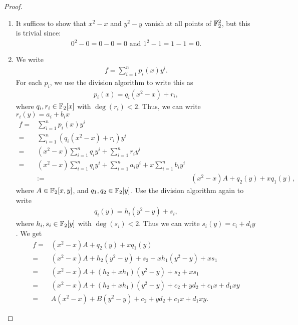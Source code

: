 \begin{proof}
    \begin{enumerate}
        \item It suffices to show that $x^2 - x$ and $y^2 - y$ vanish at all points of $\mathbb{F}_2^2$, but this is trivial since:
        \begin{align*}
            0^2 - 0 = 0-0 = 0\text{ and }1^2 - 1 = 1-1 = 0.
        \end{align*}
        \item We write
        \begin{align*}
            f = \sum_{i=1}^n p_i(x) y^i.
        \end{align*}
        For each $p_i$, we use the division algorithm to write this as
        \begin{align*}
            p_i(x) = q_i(x^2 - x) + r_i,
        \end{align*}
        where $q_i, r_i\in \mathbb{F}_2[x]$ with $\deg(r_i)<2$. Thus, we can write $r_i(y) = a_i + b_i x$
        \begin{align*}
            f 
            =& \sum_{i=1}^n p_i(x) y^i\\
            =& \sum_{i=1}^n (q_i (x^2 - x) + r_i)y^i\\
            =& (x^2 - x)\sum_{i=1}^n q_i y^i + \sum_{i=1}^n r_i y^i\\
            =& (x^2 - x)\sum_{i=1}^n q_i y^i + \sum_{i=1}^n a_i y^i + x\sum_{i=1}^n b_i y^i\\
            & := & (x^2 - x)A + q_2(y) + xq_1(y),
        \end{align*}
        where $A\in \mathbb{F}_2[x,y]$, and $q_1,q_2\in \mathbb{F}_2[y]$. 
        Use the division algorithm again to write
        \begin{align*}
            q_i(y) = h_i(y^2 - y) + s_i,
        \end{align*}
        where $h_i, s_i\in \mathbb{F}_2[y]$ with $\deg(s_i)<2$. Thus we can write $s_i(y) = c_i + d_i y$. We get
        \begin{align*}
            f
            =& (x^2 - x)A + q_2(y) + xq_1(y)\\
            =& (x^2 - x)A + h_2(y^2 - y) + s_2 + xh_1(y^2 - y) + xs_1\\
            =& (x^2 - x)A + (h_2 + xh_1)(y^2 - y) + s_2 + xs_1\\
            =& (x^2 - x)A + (h_2 + xh_1)(y^2 - y) + c_2 + yd_2 + c_1 x + d_1 xy\\
            =& A(x^2 - x) + B(y^2 - y) + c_2 + yd_2 + c_1 x + d_1 xy.
        \end{align*}

\end{enumerate}
\end{proof}
